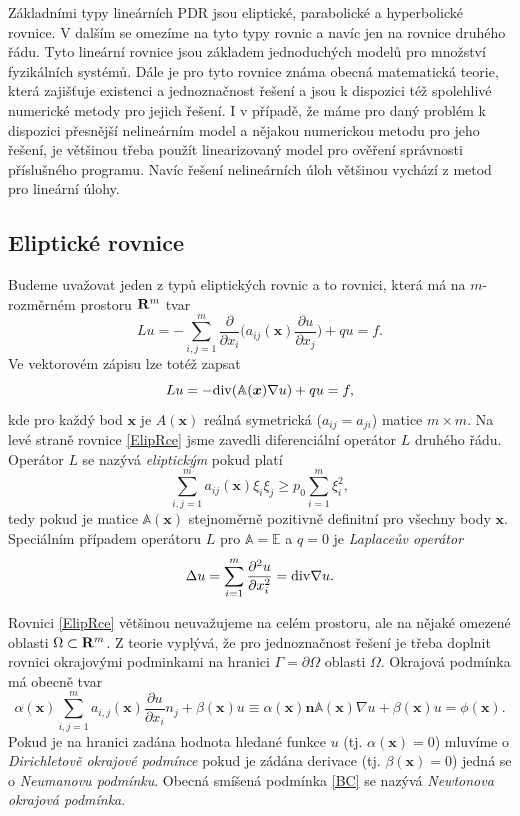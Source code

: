 \documentclass[a4paper,10pt]{article}
\def\div{{\rm div}}
\def\Lapl{\Delta}
\def\grad{\nabla}
\def\Real{{\rm\bf R}}
\def\vc#1{\mathbf{\boldsymbol{#1}}}     %
\def\tn#1{{\mathbb{#1}}}    %
\def\prtl{\partial}                                        %
\begin{document}
Základními typy lineárních PDR jsou eliptické, parabolické a hyperbolické rovnice. V dalším se omezíme na
tyto typy rovnic a navíc jen na rovnice druhého řádu. Tyto lineární rovnice jsou základem jednoduchých modelů 
pro množství fyzikálních systémů. Dále je pro tyto rovnice známa obecná
 matematická teorie, která zajišťuje existenci a jednoznačnost řešení a jsou k dispozici 
též spolehlivé numerické metody 
pro jejich řešení. I v případě, že máme pro daný problém k dispozici  přesnější 
nelineárním model a nějakou numerickou metodu pro jeho řešení, je většinou třeba použít linearizovaný model 
pro ověření správnosti příslušného programu. Navíc řešení nelineárních úloh většinou vychází z metod pro lineární 
úlohy.

\subsection{Eliptické rovnice}
Budeme uvažovat jeden z typů eliptických rovnic a to rovnici, která má na $m$-rozměrném prostoru
$\Real^m$ tvar
\begin{equation}\label{ElipRce}
   L u=-\sum_{i,j=1}^m \frac{\prtl}{\prtl x_i}\Big(a_{ij}(\vc x) \frac{\prtl u}{\prtl x_j}\Big) + qu =f.
\end{equation}
Ve vektorovém zápisu lze totéž zapsat
\[
  Lu =- \div ( \tn A(\vc x) \grad u) + qu=f,
\]
kde pro každý bod $\vc x$ je $A(\vc x)$ reálná symetrická ($a_{ij}=a_{ji}$) matice $m\times m$.
Na levé straně rovnice \eqref{ElipRce} jsme zavedli diferenciální operátor $L$ druhého řádu.
Operátor $L$ se nazývá {\it eliptickým} pokud platí
\[
   \sum_{i,j=1}^m a_{ij}(\vc x)\xi_i\xi_j\ge p_0\sum_{i=1}^m \xi_i^2,
\]
tedy pokud je matice $\tn A(\vc x)$ stejnoměrně pozitivně definitní pro všechny body $\vc x$.
Speciálním případem operátoru $L$ pro $\tn A=\tn E$ a $q=0$ je {\it Laplaceův operátor}
\[
   \Lapl u=\sum_{i=1}^m \frac{\prtl^2 u}{\prtl x_i^2}=\div\grad u.
\]

Rovnici \eqref{ElipRce} většinou neuvažujeme na celém prostoru, ale na nějaké omezené oblasti
$\Omega\subset\Real^m$.
Z teorie vyplývá, že pro jednoznačnost řešení je třeba doplnit rovnici okrajovými
podminkami na hranici $\Gamma=\prtl\Omega$ oblasti $\Omega$. Okrajová podmínka má obecně tvar
\begin{equation}\label{BC}
   \alpha(\vc x)\sum_{i,j=1}^m a_{i,j}(\vc x) \frac{\prtl u}{\prtl x_i} n_j+\beta(\vc x) u\equiv
   \alpha(\vc x)\vc n \tn A(\vc x) \grad u +\beta(\vc x) u =\phi(\vc x).
\end{equation}
Pokud je na hranici zadána hodnota hledané funkce $u$  (tj. $\alpha(\vc x) =0$) mluvíme o {\it Dirichletově okrajové podmínce} pokud je zádána derivace (tj. $\beta(\vc x)=0$) jedná se o {\it Neumanovu podmínku}. Obecná smíšená podmínka
\eqref{BC} se nazývá {\it Newtonova okrajová podmínka}.
\end{document}
